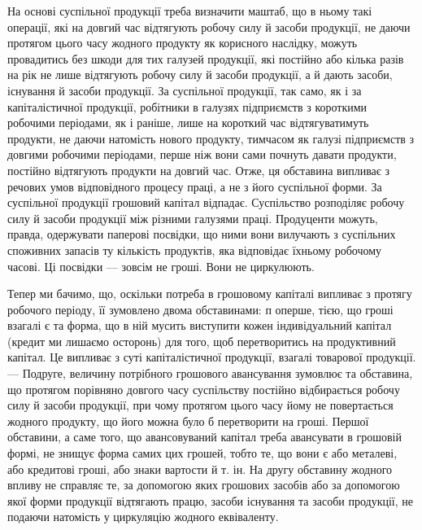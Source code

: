 На основі суспільної продукції треба визначити маштаб, що в ньому
такі операції, які на довгий час відтягують робочу силу й засоби продукції,
не даючи протягом цього часу жодного продукту як корисного
наслідку, можуть провадитись без шкоди для тих галузей продукції, які
постійно або кілька разів на рік не лише відтягують робочу силу й засоби
продукції, а й дають засоби, існування й засоби продукції. За суспільної
продукції, так само, як і за капіталістичної продукції, робітники
в галузях підприємств з короткими робочими періодами, як і раніше, лише
на короткий час відтягуватимуть продукти, не даючи натомість нового
продукту, тимчасом як галузі підприємств з довгими робочими періодами,
перше ніж вони сами почнуть давати продукти, постійно відтягують
продукти на довгий час. Отже, ця обставина випливає з речових
умов відповідного процесу праці, а не з його суспільної форми. За суспільної
продукції грошовий капітал відпадає. Суспільство розподіляє робочу
силу й засоби продукції між різними галузями праці. Продуценти
можуть, правда, одержувати паперові посвідки, що ними вони вилучають
з суспільних споживних запасів ту кількість продуктів, яка відповідає їхньому
робочому часові. Ці посвідки — зовсім не гроші. Вони не циркулюють.

Тепер ми бачимо, що, оскільки потреба в грошовому капіталі випливає
з протягу робочого періоду, її зумовлено двома обставинами: п оперше,
тією, що гроші взагалі є та форма, що в ній мусить виступити
кожен індивідуальний капітал (кредит ми лишаємо осторонь) для того,
щоб перетворитись на продуктивний капітал. Це випливає з суті капіталістичної
продукції, взагалі товарової продукції. — Подруге, величину
потрібного грошового авансування зумовлює та обставина, що протягом
порівняно довгого часу суспільству постійно відбирається робочу силу
й засоби продукції, при чому протягом цього часу йому не повертається
жодного продукту, що його можна було б перетворити на гроші.
Першої обставини, а саме того, що авансовуваний капітал треба авансувати
в грошовій формі, не знищує форма самих цих грошей, тобто те,
що вони є або металеві, або кредитові гроші, або знаки вартости й
т. ін. На другу обставину жодного впливу не справляє те, за допомогою
яких грошових засобів або за допомогою якої форми продукції
відтягають працю, засоби існування та засоби продукції, не подаючи
натомість у циркуляцію жодного еквіваленту.
